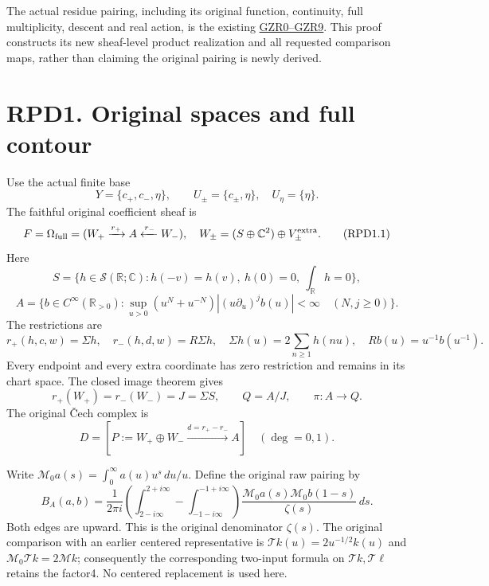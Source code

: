 The actual residue pairing, including its original function, continuity,
full multiplicity, descent and real action, is the existing
\href{https://github.com/KokunoYumeto/zeta-function-research-reader/blob/36a82ecca98addb8a98b48204e349737856c7223/workbenches/splitzero-tandem/continuations/20260924-cohomology-weight-and-character-lifts/original-character-lifting/tau_lifting_weights_20260924/GLOBAL_ORIGINAL_ZETA_RESIDUE_DUALITY_INDEPENDENT.md}{GZR0--GZR9}.
This proof constructs its new sheaf-level product realization and all
requested comparison maps, rather than claiming the original pairing is
newly derived.

\section{RPD1. Original spaces and full
contour}\label{rpd1.-original-spaces-and-full-contour}

Use the actual finite base \[
Y=\{c_+,c_-,\eta\},\qquad
U_\pm=\{c_\pm,\eta\},\quad U_\eta=\{\eta\}.
\] The faithful original coefficient sheaf is \[
F=\Omega_{\rm full}
=(W_+\xrightarrow{r_+}A\xleftarrow{r_-}W_-),
\quad
W_\pm=(S\oplus\mathbb C^2)\oplus V_\pm^{\rm extra}.
\tag{RPD1.1}
\] Here \[
S=\{h\in\mathcal S(\mathbb R;\mathbb C):
h(-v)=h(v),\ h(0)=0,\ \int_{\mathbb R}h=0\},
\] \[
A=\{b\in C^\infty(\mathbb R_{>0}):
\sup_{u>0}(u^N+u^{-N})|(u\partial_u)^jb(u)|<\infty
\quad(N,j\ge0)\}.
\] The restrictions are \[
r_+(h,c,w)=\Sigma h,\quad r_-(h,d,w)=R\Sigma h,\quad
\Sigma h(u)=2\sum_{n\ge1}h(nu),\quad Rb(u)=u^{-1}b(u^{-1}).
\tag{RPD1.2}
\] Every endpoint and every extra coordinate has zero restriction and
remains in its chart space. The closed image theorem gives \[
r_+(W_+)=r_-(W_-)=J=\Sigma S,\qquad Q=A/J,\qquad \pi:A\to Q.
\] The original Čech complex is \[
D=[P:=W_+\oplus W_-\xrightarrow{d=r_+-r_-}A]
\quad(\deg=0,1).
\tag{RPD1.3}
\]

Write \(\mathcal M_0a(s)=\int_0^\infty a(u)u^s\,du/u\). Define the
original raw pairing by \[
B_A(a,b)=\frac1{2\pi i}
\left(\int_{2-i\infty}^{2+i\infty}
-\int_{-1-i\infty}^{-1+i\infty}\right)
\frac{\mathcal M_0a(s)\mathcal M_0b(1-s)}{\zeta(s)}\,ds.
\tag{RPD1.4}
\] Both edges are upward. This is the original denominator \(\zeta(s)\).
The original comparison with an earlier centered representative is
\(\mathcal T k(u)=2u^{-1/2}k(u)\) and
\(\mathcal M_0\mathcal T k=2\mathcal M k\); consequently the
corresponding two-input formula on \(\mathcal T k,\mathcal T\ell\)
retains the factor4. No centered replacement is used here.

